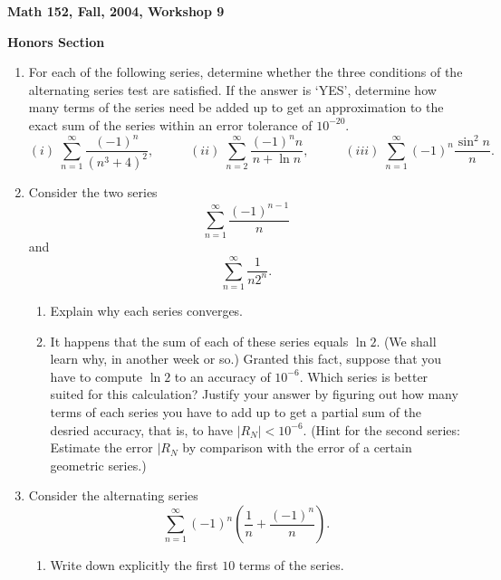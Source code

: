 \documentclass[12pt]{article}
\begin{document}
\begin{center}

{\large \bf Math 152, Fall, 2004, Workshop 9\par}
\vspace{.5cm}
{{\bf Honors Section} 
\par}
\end{center}

\begin{enumerate}

\item For each of the following series, determine whether the 
three conditions of the alternating series 
test are satisfied. If the answer is `YES', determine how many 
terms of the series need be added 
up to get an approximation to the exact sum of the series 
within an error tolerance of $10^{-20}$.
$$(i) \; \sum_{n=1}^{\infty}\frac{(-1)^{n}}{(n^{3}+4)^{2}},\;\;\;\;\;\;\;\;\;\;
(ii)\;  \sum_{n=2}^{\infty}\frac{(-1)^{n}n}{n+\ln n}, \;\;\;\;\;\;\;\;\;\;
(iii) \; \sum_{n=1}^{\infty}(-1)^{n}\frac{\sin^{2}n}{n}.$$

\item Consider the two series
$$\sum_{n=1}^{\infty}\frac{(-1)^{n-1}}{n}$$
and 
$$\sum_{n=1}^{\infty}\frac{1}{n2^{n}}.$$

\begin{enumerate}

\item Explain why each series converges.

\item It happens that the
sum of each of these series equals $\ln 2$. 
(We shall learn why, in another week 
or so.) Granted this fact, suppose that you have to compute 
$\ln 2$ to an accuracy of $10^{-6}$. Which series 
is better suited for this calculation? Justify your answer
by figuring out how many terms of each series you have to add up
to get a partial sum of the desried accuracy, that is, to
have $|R_{N}|<10^{-6}$. (Hint for the second series: 
Estimate the error $|R_{N}$ by comparison with the error
of a certain geometric series.)

\end{enumerate}

\item Consider the alternating series 
$$\sum_{n=1}^{\infty}(-1)^{n}\left(\frac{1}{n}+\frac{(-1)^{n}}{n}\right).$$

\begin{enumerate}

\item Write down explicitly the first $10$ terms of the series. 


\end{enumerate}
\end{enumerate}
\end{document}
